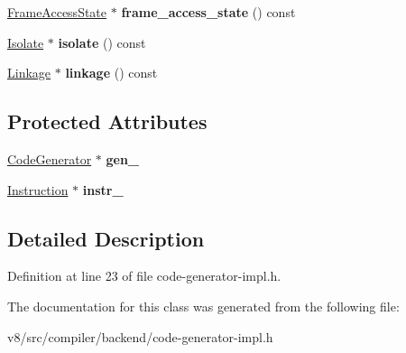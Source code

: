\begin{DoxyCompactItemize}
\mbox{\hyperlink{classv8_1_1internal_1_1compiler_1_1FrameAccessState}{Frame\+Access\+State}} $\ast$ {\bfseries frame\+\_\+access\+\_\+state} () const
\item 
\mbox{\label{classv8_1_1internal_1_1compiler_1_1InstructionOperandConverter_ac556e65621b672d70c6f2324f38c9923}} 
\mbox{\hyperlink{classv8_1_1internal_1_1Isolate}{Isolate}} $\ast$ {\bfseries isolate} () const
\item 
\mbox{\label{classv8_1_1internal_1_1compiler_1_1InstructionOperandConverter_abc6444854dbb9b6be95a7c55886f48d1}} 
\mbox{\hyperlink{classv8_1_1internal_1_1compiler_1_1Linkage}{Linkage}} $\ast$ {\bfseries linkage} () const
\end{DoxyCompactItemize}
\subsection*{Protected Attributes}
\begin{DoxyCompactItemize}
\item 
\mbox{\label{classv8_1_1internal_1_1compiler_1_1InstructionOperandConverter_acc0d3914ad583d50353785bd96bd3419}} 
\mbox{\hyperlink{classv8_1_1internal_1_1compiler_1_1CodeGenerator}{Code\+Generator}} $\ast$ {\bfseries gen\+\_\+}
\item 
\mbox{\label{classv8_1_1internal_1_1compiler_1_1InstructionOperandConverter_aa5523456b16d6f10745fc917a47dbc4f}} 
\mbox{\hyperlink{classv8_1_1internal_1_1compiler_1_1Instruction}{Instruction}} $\ast$ {\bfseries instr\+\_\+}
\end{DoxyCompactItemize}


\subsection{Detailed Description}


Definition at line 23 of file code-\/generator-\/impl.\+h.



The documentation for this class was generated from the following file\+:\begin{DoxyCompactItemize}
\item 
v8/src/compiler/backend/code-\/generator-\/impl.\+h\end{DoxyCompactItemize}
